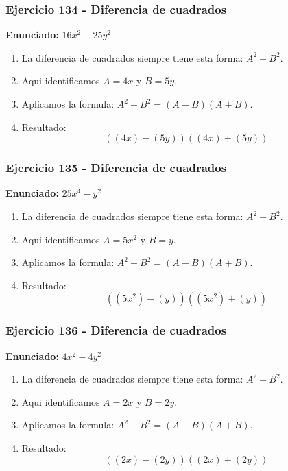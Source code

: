 \documentclass[11pt,a4paper]{article}
\begin{document}
\vspace{0.2cm}
\subsubsection*{Ejercicio 134 - Diferencia de cuadrados}
\textbf{Enunciado:} $ 16 x^{2} - 25 y^{2} $\par
\begin{enumerate}[leftmargin=2em]
\item La diferencia de cuadrados siempre tiene esta forma: \(A^2-B^2\).
\item Aqui identificamos \(A=4 x\) y \(B=5 y\).
\item Aplicamos la formula: \(A^2-B^2=(A-B)(A+B)\).
\item Resultado: \[\boxed{\left(\left(4 x\right)-\left(5 y\right)\right)\left(\left(4 x\right)+\left(5 y\right)\right)}\]
\end{enumerate}

\vspace{0.2cm}
\subsubsection*{Ejercicio 135 - Diferencia de cuadrados}
\textbf{Enunciado:} $ 25 x^{4} - y^{2} $\par
\begin{enumerate}[leftmargin=2em]
\item La diferencia de cuadrados siempre tiene esta forma: \(A^2-B^2\).
\item Aqui identificamos \(A=5 x^{2}\) y \(B=y\).
\item Aplicamos la formula: \(A^2-B^2=(A-B)(A+B)\).
\item Resultado: \[\boxed{\left(\left(5 x^{2}\right)-\left(y\right)\right)\left(\left(5 x^{2}\right)+\left(y\right)\right)}\]
\end{enumerate}

\vspace{0.2cm}
\subsubsection*{Ejercicio 136 - Diferencia de cuadrados}
\textbf{Enunciado:} $ 4 x^{2} - 4 y^{2} $\par
\begin{enumerate}[leftmargin=2em]
\item La diferencia de cuadrados siempre tiene esta forma: \(A^2-B^2\).
\item Aqui identificamos \(A=2 x\) y \(B=2 y\).
\item Aplicamos la formula: \(A^2-B^2=(A-B)(A+B)\).
\item Resultado: \[\boxed{\left(\left(2 x\right)-\left(2 y\right)\right)\left(\left(2 x\right)+\left(2 y\right)\right)}\]
\end{enumerate}
\end{document}
